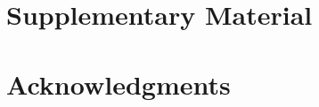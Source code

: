 \documentclass[nogrid]{MBE}%
\begin{document}
\section{Supplementary Material}


\section{Acknowledgments}



\end{document}
